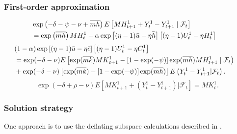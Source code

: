 \documentclass[12pt]{article}
\begin{document}
\subsubsection{First-order approximation}
\begin{align} \label{firstorder1}
&   \exp \left(-\delta - \psi - \nu + \overline{mh} \right) E\left[ MH_{t+1}^1 +  Y_t^1 - Y_{t+1}^1  \mid {\mathcal F}_t \right]\cr
& =   \exp\left(  \overline{mh} \right) MH_t^1  - \alpha \exp\left[ (\eta - 1) {\bar u}- \eta {\bar h}  \right]\left[ (\eta - 1) U_t^1 - \eta H_t^1 \right] \end{align}
\begin{align}\label{firstorder2}
 &(1- \alpha) \exp\left[ (\eta - 1)  {\bar u} - \eta {\bar c} \right]   \left[ ( \eta - 1) U_t^1 - \eta C_t^1\right] \cr
  & =   \exp(-\delta -\nu) E \left[ \exp( \overline{mk}){MK}_{t+1}^1  -  [1 - \exp(-\psi)]  \exp( \overline{mh} ) MH_{t+1}^1  \mid {\mathcal F}_t \right) \cr
 & +  \exp( - \delta - \nu) \left[ \exp( \overline{mk})  -  [1 - \exp(-\psi)] \exp(\overline{mh}) \right]E\left( Y_t^1 - Y_{t+1}^1 \vert {\mathcal F}_t\right).
\end{align}
\begin{equation}\label{firstorder3}
\exp(-\delta + \rho - \nu) E\left[ {MK}_{t+1}^1 + (Y_t^1 - Y_{t+1}^1) \vert {\mathcal F}_t \right] = {MK}_t^1.
\end{equation}

\subsubsection{Solution strategy}

One approach is to use the deflating subspace calculations described in  \citet[ch.~4]{HSrobustnessmonograph}.
\end{document}
